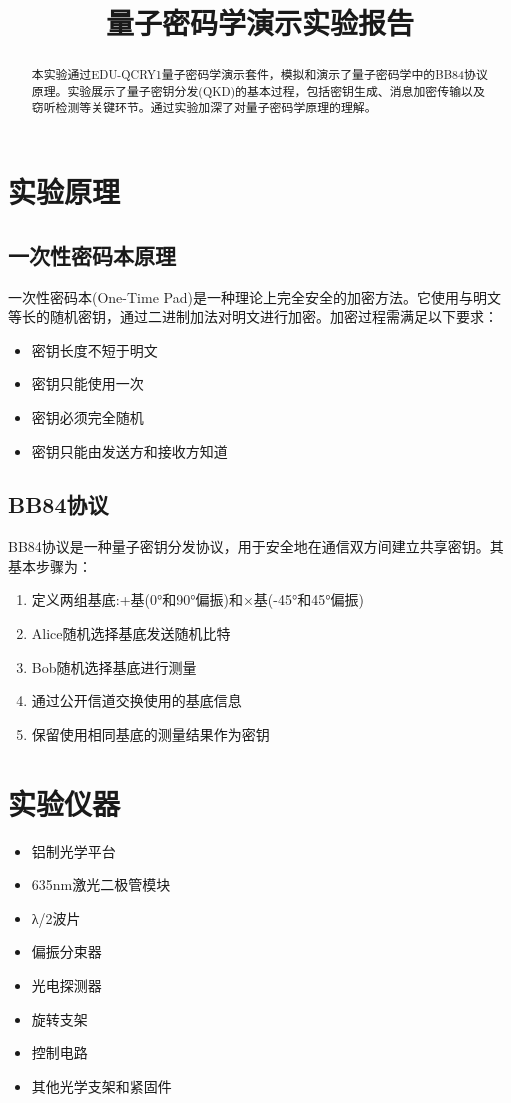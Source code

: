 \documentclass{ctexart}
\title{量子密码学演示实验报告}
\begin{document}
\maketitle

\begin{abstract}
本实验通过EDU-QCRY1量子密码学演示套件，模拟和演示了量子密码学中的BB84协议原理。实验展示了量子密钥分发(QKD)的基本过程，包括密钥生成、消息加密传输以及窃听检测等关键环节。通过实验加深了对量子密码学原理的理解。
\end{abstract}

\section{实验原理}
\subsection{一次性密码本原理}
一次性密码本(One-Time Pad)是一种理论上完全安全的加密方法。它使用与明文等长的随机密钥，通过二进制加法对明文进行加密。加密过程需满足以下要求：
\begin{itemize}
\item 密钥长度不短于明文
\item 密钥只能使用一次
\item 密钥必须完全随机
\item 密钥只能由发送方和接收方知道
\end{itemize}

\subsection{BB84协议}
BB84协议是一种量子密钥分发协议，用于安全地在通信双方间建立共享密钥。其基本步骤为：
\begin{enumerate}
\item 定义两组基底:+基(0°和90°偏振)和×基(-45°和45°偏振)
\item Alice随机选择基底发送随机比特
\item Bob随机选择基底进行测量
\item 通过公开信道交换使用的基底信息
\item 保留使用相同基底的测量结果作为密钥
\end{enumerate}

\section{实验仪器}
\begin{itemize}
\item 铝制光学平台
\item 635nm激光二极管模块
\item λ/2波片
\item 偏振分束器
\item 光电探测器
\item 旋转支架
\item 控制电路
\item 其他光学支架和紧固件
\end{itemize}
\end{document}

